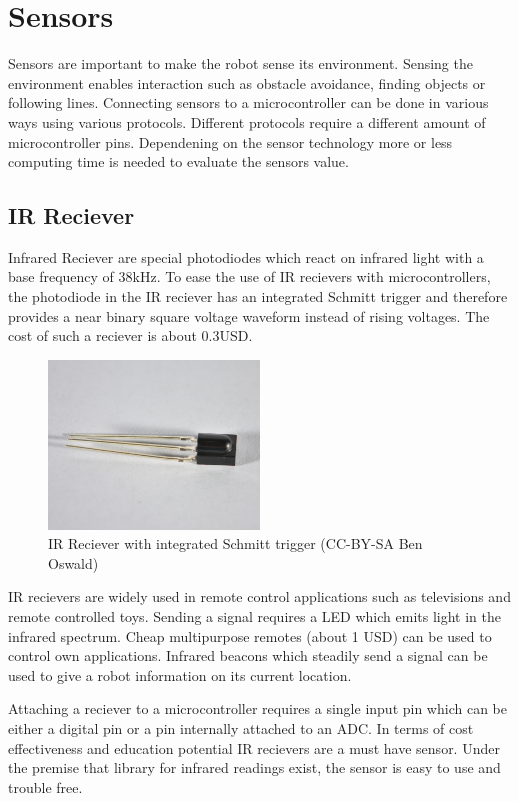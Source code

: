 \section{Sensors}
Sensors are important to make the robot sense its environment. Sensing the environment enables interaction such as obstacle avoidance, finding objects or following lines. Connecting sensors to a microcontroller can be done in various ways using various protocols. Different protocols require a different amount of microcontroller pins. Dependening on the sensor technology more or less computing time is needed to evaluate the sensors value.  

\subsection{IR Reciever}
Infrared Reciever are special photodiodes which react on infrared light with a base frequency of 38kHz. To ease the use of IR recievers with microcontrollers, the photodiode in the IR reciever has an integrated Schmitt trigger and therefore provides a near binary square voltage waveform instead of rising voltages. The cost of such a reciever is about 0.3USD.

\begin{figure}[H]
  \centering
  \includegraphics[width=0.5\textwidth]{images/30_ir.jpg}
  \caption{IR Reciever with integrated Schmitt trigger (CC-BY-SA Ben Oswald)}
\end{figure}

IR recievers are widely used in remote control applications such as televisions and remote controlled toys. Sending a signal requires a LED which emits light in the infrared spectrum. Cheap multipurpose remotes (about 1 USD) can be used to control own applications. Infrared beacons which steadily send a signal can be used to give a robot information on its current location.

Attaching a reciever to a microcontroller requires a single input pin which can be either a digital pin or a pin internally attached to an ADC. In terms of cost effectiveness and education potential IR recievers are a must have sensor. Under the premise that library for infrared readings exist, the sensor is easy to use and trouble free.


